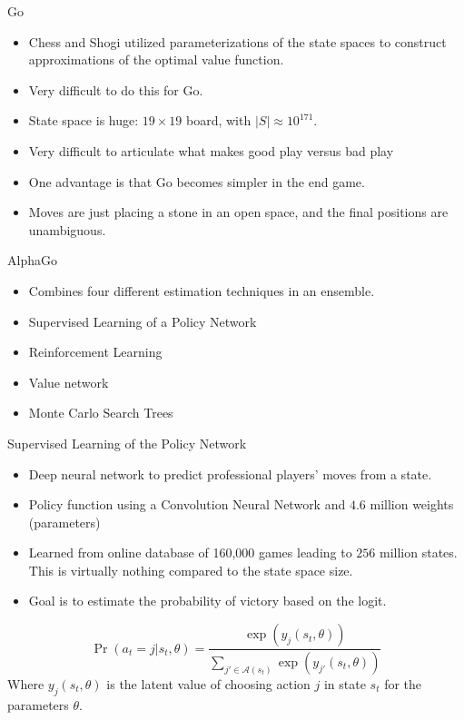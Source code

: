 \documentclass[presentation]{beamer}
\begin{document}
\begin{frame}[label={sec:org530f51d}]{Go}
\begin{itemize}
\item Chess and Shogi utilized parameterizations of the state spaces to
construct approximations of the optimal value function.
\item Very difficult to do this for Go.
\item State space is huge: \(19 \times 19\) board, with \(\vert S \vert \approx 10^{171}\).
\item Very difficult to articulate what makes good play versus bad play
\item One advantage is that Go becomes simpler in the end game.
\item Moves are just placing a stone in an open space, and the final
positions are unambiguous.
\end{itemize}
\end{frame}

\begin{frame}[label={sec:orgfb17039}]{AlphaGo}
\begin{itemize}
\item Combines four different estimation techniques in an ensemble.
\item Supervised Learning of a Policy Network
\item Reinforcement Learning
\item Value network
\item Monte Carlo Search Trees
\end{itemize}
\end{frame}

\begin{frame}[label={sec:org5da00ea}]{Supervised Learning of the Policy Network}
\begin{itemize}
\item Deep neural network to predict professional players' moves from a
state.
\item Policy function using a Convolution Neural Network and \(4.6\) million
weights (parameters)
\item Learned from online database of 160,000 games leading to \(256\)
million states. This is virtually nothing compared to the state
space size.
\item Goal is to estimate the probability of victory based on the logit.
\end{itemize}
\begin{equation*}
  \Pr( a_t = j \vert s_t, \theta) = \frac{\exp(y_j(s_t, \theta))}{\sum_{j'\in
      \mathcal{A}(s_t)} \exp( y_{j'}(s_t, \theta))} 
\end{equation*}
Where $y_j(s_t,\theta)$ is the latent value of choosing action $j$ in state
$s_t$ for the parameters $\theta$.
\end{frame}
\end{document}
